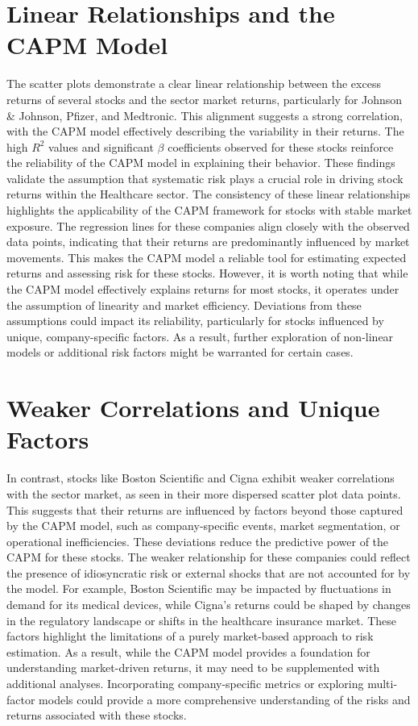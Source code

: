 \section{Linear Relationships and the CAPM Model}
The scatter plots demonstrate a clear linear relationship between the excess returns of several stocks and the sector market
returns, particularly for Johnson \& Johnson, Pfizer, and Medtronic. 
This alignment suggests a strong correlation, with the CAPM model effectively describing the variability in their returns. 
The high $R^2$ values and significant $\beta$ coefficients observed for these stocks reinforce the reliability of the CAPM 
model in explaining their behavior. 
These findings validate the assumption that systematic risk plays a crucial role in driving stock returns within the Healthcare
sector.
The consistency of these linear relationships highlights the applicability of the CAPM framework for stocks with stable market 
exposure. 
The regression lines for these companies align closely with the observed data points, indicating that their returns are
predominantly influenced by market movements. 
This makes the CAPM model a reliable tool for estimating expected returns and assessing risk for these stocks.
However, it is worth noting that while the CAPM model effectively explains returns for most stocks, it operates under the 
assumption of linearity and market efficiency. 
Deviations from these assumptions could impact its reliability, particularly for stocks influenced by unique, 
company-specific factors.
As a result, further exploration of non-linear models or additional risk factors might be warranted for certain cases.

\section{Weaker Correlations and Unique Factors}
In contrast, stocks like Boston Scientific and Cigna exhibit weaker correlations with the sector market, as seen in their
more dispersed scatter plot data points. 
This suggests that their returns are influenced by factors beyond those captured by the CAPM model, such as company-specific
events, market segmentation, or operational inefficiencies. 
These deviations reduce the predictive power of the CAPM for these stocks.
The weaker relationship for these companies could reflect the presence of idiosyncratic risk or external shocks that are 
not accounted for by the model. For example, Boston Scientific may be impacted by fluctuations in demand for its medical 
devices, while Cigna's returns could be shaped by changes in the regulatory landscape or shifts in the healthcare insurance 
market. These factors highlight the limitations of a purely market-based approach to risk estimation.
As a result, while the CAPM model provides a foundation for understanding market-driven returns, it may need to be 
supplemented with additional analyses. Incorporating company-specific metrics or exploring multi-factor models could provide a more comprehensive understanding of the risks and returns associated with these stocks.

